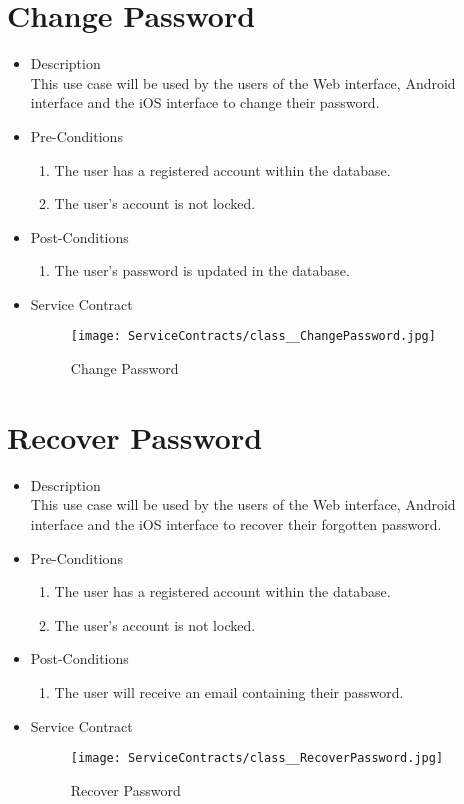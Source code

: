 \documentclass[11pt,fleqn]{book} %
\begin{document}
\section{Change Password}
\begin{itemize}
	\item Description\\
	This use case will be used by the users of the Web interface, Android interface and the iOS interface to change their password.
	\item Pre-Conditions
	\begin{enumerate}
		\item The user has a registered account within the database.
		\item The user’s account is not locked.
	\end{enumerate}
	\item Post-Conditions
	\begin{enumerate}
		\item The user’s password is updated in the database. 
	\end{enumerate}
	\item Service Contract
	\begin{figure}
		\texttt{[image: ServiceContracts/class\_\_ChangePassword.jpg]}
		\caption{Change Password}
	\end{figure}
\end{itemize}

\section{Recover Password}
\begin{itemize}
	\item Description\\
	This use case will be used by the users of the Web interface, Android interface and the iOS interface to recover their forgotten password.
	\item Pre-Conditions
	\begin{enumerate}
		\item The user has a registered account within the database.
		\item The user’s account is not locked.
	\end{enumerate}
	\item Post-Conditions
	\begin{enumerate}
		\item The user will receive an email containing their password.
	\end{enumerate}
	\item Service Contract
	\begin{figure}
		\texttt{[image: ServiceContracts/class\_\_RecoverPassword.jpg]}
		\caption{Recover Password}
	\end{figure}
\end{itemize}
\end{document}

